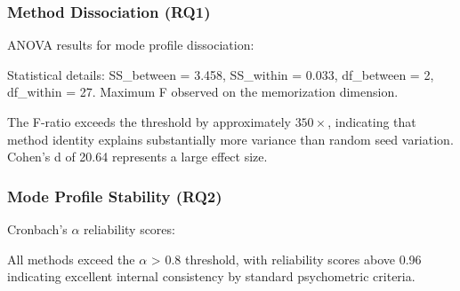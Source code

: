 
\subsubsection{Method Dissociation (RQ1)}

ANOVA results for mode profile dissociation:

\begin{table}[htbp]
\centering
{}
\end{table}

Statistical details: SS\_between = 3.458, SS\_within = 0.033, df\_between = 2, df\_within = 27. Maximum F observed on the memorization dimension.

The F-ratio exceeds the threshold by approximately $350\times$, indicating that method identity explains substantially more variance than random seed variation. Cohen's d of 20.64 represents a large effect size.

\subsubsection{Mode Profile Stability (RQ2)}

Cronbach's $\alpha$ reliability scores:

\begin{table}[htbp]
\centering
{}
\end{table}

All methods exceed the $\alpha$ > 0.8 threshold, with reliability scores above 0.96 indicating excellent internal consistency by standard psychometric criteria.

